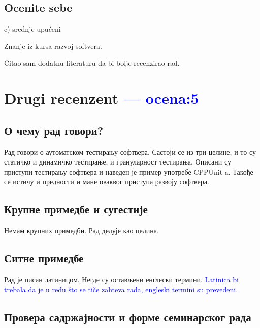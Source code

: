 \documentclass[a4paper]{report}
\newcommand{\odgovor}[1]{\textcolor{blue}{#1}}
\begin{document}
\section{Ocenite sebe}
 c) srednje upućeni

Znanje iz kursa razvoj softvera.

Čitao sam dodatnu literaturu da bi bolje recenzirao rad.



\chapter{Drugi recenzent \odgovor{--- ocena:5} }

\section{О чему рад говори?}
Рад говори о аутоматском тестирању софтвера. Састоји се из три целине, и то су статичко и динамичко тестирање, и грануларност тестирања. Описани су приступи тестирању софтвера и наведен је пример употребе CPPUnit-a. Такође се истичу и предности и мане оваквог приступа развоју софтвера. 

\section{Крупне примедбе и сугестије}
Немам крупних примедби. Рад делује као целина. 

\section{Ситне примедбе}
Рад је писан латиницом. Негде су остављени енглески термини.
\odgovor{Latinica bi trebala da je u redu što se tiče zahteva rada, engleski termini su prevedeni.}

\section{Провера садржајности и форме семинарског рада}
\end{document}
